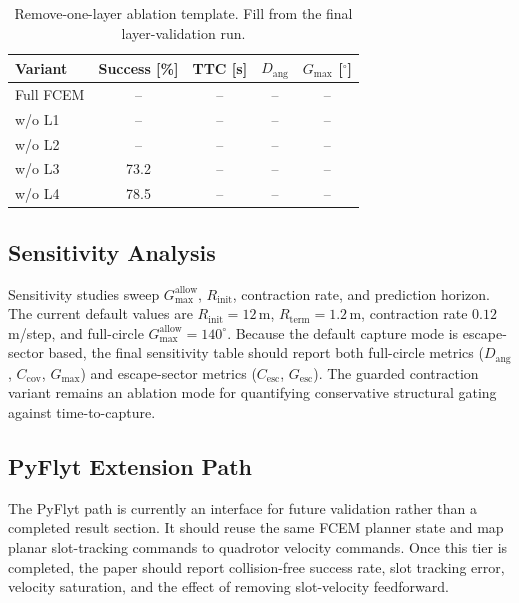 \documentclass[journal]{IEEEtran}
\newcommand{\Dang}{D_{\mathrm{ang}}}
\newcommand{\Ccov}{C_{\mathrm{cov}}}
\newcommand{\Gmax}{G_{\max}}
\begin{document}
\begin{table}[!t]
  \caption{Remove-one-layer ablation template. Fill from the final layer-validation run.}
  \label{tab:layer_drop}
  \centering
  \small
  \begin{tabular}{@{}lcccc@{}}
    \toprule
    Variant & Success [\%] & TTC [s] & $\Dang$ & $\Gmax$ [$^\circ$] \\
    \midrule
    Full FCEM        & -- & -- & -- & -- \\
    w/o L1           & --   & -- & -- & -- \\
    w/o L2           & --   & -- & -- & -- \\
    w/o L3           & 73.2 & -- & -- & -- \\
    w/o L4           & 78.5 & -- & -- & -- \\
    \bottomrule
  \end{tabular}
\end{table}

\subsection{Sensitivity Analysis}
\label{sec:sensitivity}

Sensitivity studies sweep $\Gmax^{\mathrm{allow}}$, $R_{\mathrm{init}}$, contraction rate, and prediction horizon.
The current default values are $R_{\mathrm{init}} = 12$\,m, $R_{\mathrm{term}} = 1.2$\,m, contraction rate $0.12$\,m/step, and full-circle $\Gmax^{\mathrm{allow}} = 140^\circ$.
Because the default capture mode is escape-sector based, the final sensitivity table should report both full-circle metrics ($\Dang$, $\Ccov$, $\Gmax$) and escape-sector metrics ($C_{\mathrm{esc}}$, $G_{\mathrm{esc}}$).
The guarded contraction variant remains an ablation mode for quantifying conservative structural gating against time-to-capture.

\subsection{PyFlyt Extension Path}
\label{sec:pyflyt}

The PyFlyt path is currently an interface for future validation rather than a completed result section.
It should reuse the same FCEM planner state and map planar slot-tracking commands to quadrotor velocity commands.
Once this tier is completed, the paper should report collision-free success rate, slot tracking error, velocity saturation, and the effect of removing slot-velocity feedforward.
\end{document}
